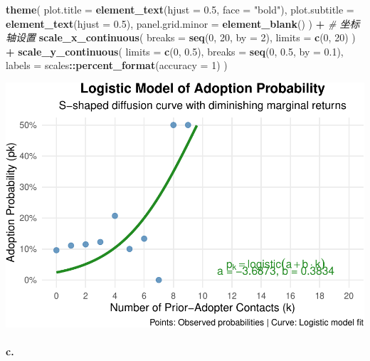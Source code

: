 \documentclass[
]{article}
\newenvironment{Shaded}{\begin{snugshade}}{\end{snugshade}}
\newcommand{\AttributeTok}[1]{\textcolor[rgb]{0.13,0.29,0.53}{#1}}
\newcommand{\CommentTok}[1]{\textcolor[rgb]{0.56,0.35,0.01}{\textit{#1}}}
\newcommand{\DecValTok}[1]{\textcolor[rgb]{0.00,0.00,0.81}{#1}}
\newcommand{\FloatTok}[1]{\textcolor[rgb]{0.00,0.00,0.81}{#1}}
\newcommand{\FunctionTok}[1]{\textcolor[rgb]{0.13,0.29,0.53}{\textbf{#1}}}
\newcommand{\NormalTok}[1]{#1}
\newcommand{\SpecialCharTok}[1]{\textcolor[rgb]{0.81,0.36,0.00}{\textbf{#1}}}
\newcommand{\StringTok}[1]{\textcolor[rgb]{0.31,0.60,0.02}{#1}}
\begin{document}
\begin{Shaded}
\begin{Highlighting}[]
  \FunctionTok{theme}\NormalTok{(}
    \AttributeTok{plot.title =} \FunctionTok{element\_text}\NormalTok{(}\AttributeTok{hjust =} \FloatTok{0.5}\NormalTok{, }\AttributeTok{face =} \StringTok{"bold"}\NormalTok{),}
    \AttributeTok{plot.subtitle =} \FunctionTok{element\_text}\NormalTok{(}\AttributeTok{hjust =} \FloatTok{0.5}\NormalTok{),}
    \AttributeTok{panel.grid.minor =} \FunctionTok{element\_blank}\NormalTok{()}
\NormalTok{  ) }\SpecialCharTok{+}
  \CommentTok{\# 坐标轴设置}
  \FunctionTok{scale\_x\_continuous}\NormalTok{(}
    \AttributeTok{breaks =} \FunctionTok{seq}\NormalTok{(}\DecValTok{0}\NormalTok{, }\DecValTok{20}\NormalTok{, }\AttributeTok{by =} \DecValTok{2}\NormalTok{),}
    \AttributeTok{limits =} \FunctionTok{c}\NormalTok{(}\DecValTok{0}\NormalTok{, }\DecValTok{20}\NormalTok{)}
\NormalTok{  ) }\SpecialCharTok{+}
  \FunctionTok{scale\_y\_continuous}\NormalTok{(}
    \AttributeTok{limits =} \FunctionTok{c}\NormalTok{(}\DecValTok{0}\NormalTok{, }\FloatTok{0.5}\NormalTok{),}
    \AttributeTok{breaks =} \FunctionTok{seq}\NormalTok{(}\DecValTok{0}\NormalTok{, }\FloatTok{0.5}\NormalTok{, }\AttributeTok{by =} \FloatTok{0.1}\NormalTok{),}
    \AttributeTok{labels =}\NormalTok{ scales}\SpecialCharTok{::}\FunctionTok{percent\_format}\NormalTok{(}\AttributeTok{accuracy =} \DecValTok{1}\NormalTok{)}
\NormalTok{  )}
\end{Highlighting}
\end{Shaded}

\includegraphics{Homework-04_files/figure-latex/unnamed-chunk-6-1.pdf}

\paragraph{c.~}\label{c.}
\end{document}
